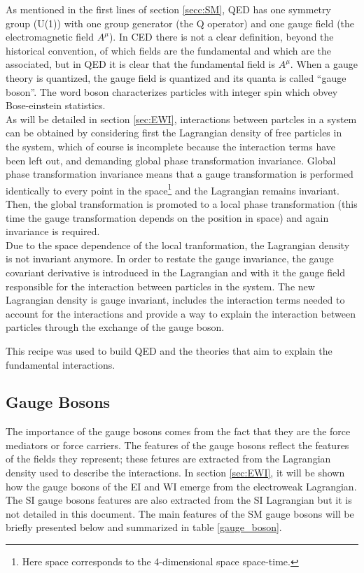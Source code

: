 \noindent As mentioned in the first lines of section \ref{secc:SM}, QED has one symmetry group (U(1)) with one group generator (the Q operator) and one gauge field (the electromagnetic field $A^\mu$). In CED there is not a clear definition, beyond the historical convention, of which fields are the fundamental and which are the associated, but in QED it is clear that the fundamental field is $A^\mu$. When a gauge theory is quantized, the gauge field is quantized and its quanta is called ``gauge boson''. The word boson characterizes particles with integer spin which obvey Bose-einstein statistics.\\      

\noindent As will be detailed in section \ref{sec:EWI}, interactions between partcles in a system can be obtained by considering first the Lagrangian density of free particles in the system, which of course is incomplete because the interaction terms have been left out, and demanding global phase transformation invariance. Global phase transformation invariance means that a gauge transformation is performed identically to every point in the space\footnote{Here space corresponds to the 4-dimensional space \ie space-time.} and the Lagrangian remains invariant. Then, the global transformation is promoted to a local phase transformation (this time the gauge transformation depends on the position in space) and again invariance is required.\\

\noindent Due to the space dependence of the local tranformation, the Lagrangian density is not invariant anymore. In order to restate the gauge invariance, the gauge covariant derivative is introduced in the Lagrangian and with it the gauge field responsible for the interaction between particles in the system. The new Lagrangian density is gauge invariant, includes the interaction terms needed to account for the interactions and provide a way to explain the interaction between particles through the exchange of the gauge boson.

\noindent This recipe was used to build QED and the theories that aim to explain the fundamental interactions.   

\subsection{Gauge Bosons}\label{sec:gb}

The importance of the gauge bosons comes from the fact that they are the force mediators or force carriers. The features of the gauge bosons reflect the features of the fields they represent; these fetures are extracted from the Lagrangian density used to describe the interactions. In section \ref{sec:EWI}, it will be shown how the gauge bosons of the EI and WI emerge from the electroweak Lagrangian. The SI gauge bosons features are also extracted from the SI Lagrangian but it is not detailed in this document. The main features of the SM gauge bosons will be briefly presented below and summarized in table \ref{gauge_boson}.

